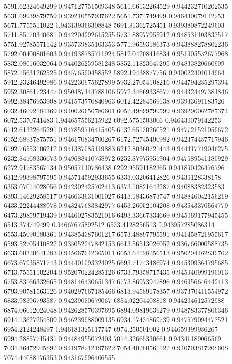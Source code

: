 {5591.62324649299 0.947127751509348
5611.66132264529 0.944232710202535
5631.69939879759 0.939210557937622
5651.7374749499 0.946430079142253
5671.7755511022 0.943139366308848
5691.81362725451 0.939380872249603
5711.85170340681 0.942204292615255
5731.88977955912 0.948631103833517
5751.92785571142 0.935739835103353
5771.96593186373 0.943888278802236
5792.00400801603 0.941938785711924
5812.04208416834 0.951905532677968
5832.08016032064 0.944026259581248
5852.11823647295 0.94833820660909
5872.15631262525 0.94576590458552
5892.19438877756 0.940022401014964
5912.23246492986 0.942230975627899
5932.27054108216 0.944794285297394
5952.30861723447 0.950487144788106
5972.34669338677 0.944324497381846
5992.38476953908 0.941573770840963
6012.42284569138 0.93933691183726
6032.46092184369 0.940026656786601
6052.49899799599 0.939296062787374
6072.5370741483 0.944657556215922
6092.5751503006 0.946430079142253
6112.61322645291 0.947859716415405
6132.65130260521 0.947721521059672
6152.68937875751 0.946170834700267
6172.72745490982 0.942374487717946
6192.76553106212 0.941387085119883
6212.80360721443 0.944417719046275
6232.84168336673 0.949688410758972
6252.87975951904 0.947689541180929
6272.91783567134 0.95057110786438
6292.95591182365 0.941890426476796
6312.99398797595 0.945714592933655
6333.03206412826 0.9436128338178
6353.07014028056 0.942302425702413
6373.10821643287 0.94088382323583
6393.14629258517 0.946633931001027
6413.18436873747 0.948846042156219
6433.22244488978 0.943247683842977
6453.26052104208 0.943543370564779
6473.29859719439 0.944602783521016
6493.33667334669 0.945069177945455
6513.374749499 0.94667675892512
6533.4128256513 0.943957285086314
6553.45090180361 0.943854387601217
6573.48897795591 0.941458721955617
6593.52705410822 0.935052247842153
6613.56513026052 0.936766000588735
6633.60320641283 0.945667942365011
6653.64128256513 0.950294462839762
6673.67935871743 0.944401093324025
6693.71743486974 0.945309364795685
6713.75551102204 0.952070224285126
6733.79358717435 0.945940999190013
6753.83166332665 0.948146430651347
6773.86973947896 0.946956646442413
6793.90781563126 0.940297667185466
6813.94589178357 0.937370411554972
6833.98396793587 0.94239030679067
6854.02204408818 0.944204612572988
6874.06012024048 0.942628570397695
6894.09819639279 0.948783377806346
6914.13627254509 0.946239988009135
6934.17434869739 0.947679094473521
6954.2124248497 0.946181325117747
6974.250501002 0.944659399986267
6994.28857715431 0.94484955072403
7014.32665330661 0.94341189066569
7034.36472945892 0.941978212197622
7054.40280561122 0.940703817208608
7074.44088176353 0.943167996406555
}
